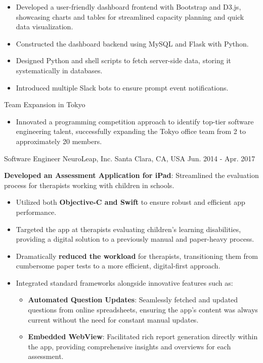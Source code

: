\begin{cventries}
{\begin{cvitems}
        \begin{itemize}
          \item Developed a user-friendly dashboard frontend with Bootstrap and D3.js, showcasing charts and tables for streamlined capacity planning and quick data visualization.
          \item Constructed the dashboard backend using MySQL and Flask with Python.
          \item Designed Python and shell scripts to fetch server-side data, storing it systematically in databases.
          \item Introduced multiple Slack bots to ensure prompt event notifications.
        \end{itemize}
        \item Team Expansion in Tokyo
        \begin{itemize}
          \item Innovated a programming competition approach to identify top-tier software engineering talent, successfully expanding the Tokyo office team from 2 to approximately 20 members.
        \end{itemize}
      \end{cvitems}
    }

  \cventry
    {Software Engineer} %
    {NeuroLeap, Inc.} %
    {Santa Clara, CA, USA} %
    {Jun. 2014 - Apr. 2017} %
    {
      \begin{cvitems} %
        \item \textbf{Developed an Assessment Application for iPad}: Streamlined the evaluation process for therapists working with children in schools.
    \begin{itemize}
        \item Utilized both \textbf{Objective-C and Swift} to ensure robust and efficient app performance.
        \item Targeted the app at therapists evaluating children's learning disabilities, providing a digital solution to a previously manual and paper-heavy process.
        \item Dramatically \textbf{reduced the workload} for therapists, transitioning them from cumbersome paper tests to a more efficient, digital-first approach.
        \item Integrated standard frameworks alongside innovative features such as:
        \begin{itemize}
            \item \textbf{Automated Question Updates}: Seamlessly fetched and updated questions from online spreadsheets, ensuring the app's content was always current without the need for constant manual updates.
            \item \textbf{Embedded WebView}: Facilitated rich report generation directly within the app, providing comprehensive insights and overviews for each assessment.
        \end{itemize}
    \end{itemize}
      \end{cvitems}
    }

\end{cventries}
